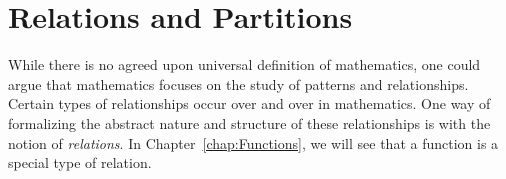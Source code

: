 \chapter{Relations and Partitions}\label{chap:Relations Partitions}


While there is no agreed upon universal definition of mathematics, one could argue that mathematics focuses on the study of patterns and relationships. Certain types of relationships occur over and over in mathematics.  One way of formalizing the abstract nature and structure of these relationships is with the notion of \emph{relations}. In Chapter~\ref{chap:Functions}, we will see that a function is a special type of relation.